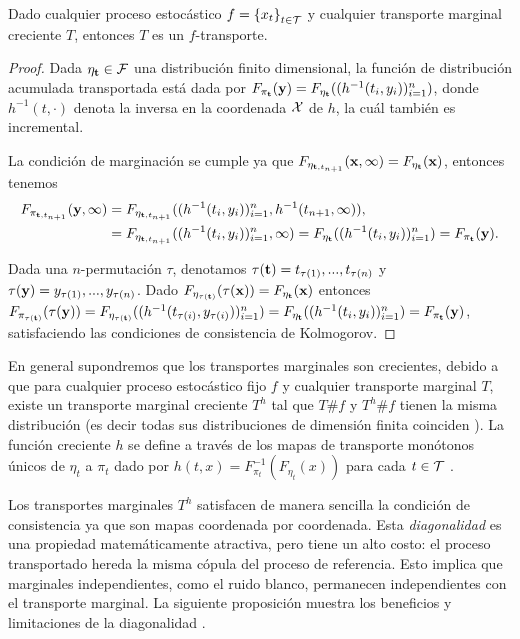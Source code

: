 \begin{proposition}
	Dado cualquier proceso estocástico \(f=\left\{ x_{t}\right\}_{t\in \mathcal{T}}\) y cualquier transporte marginal creciente \(T\), entonces \(T\) es un \(f\)-transporte.
	\begin{proof}
		Dada \(\eta_{\mathbf{t}} \in \mathcal{F}\) una distribución finito dimensional, la función de distribución acumulada transportada está dada por \(F_{\pi_{\mathbf{t}}}(\mathbf{y}) = F_{\eta_{\mathbf{t}}}((h^{-1}(t_i,y_i))_{i=1}^n)\), donde \(h^{-1}(t,\cdot)\) denota la inversa en la coordenada \(\mathcal{X}\) de \(h\), la cuál también es incremental. 
		
		La condición de marginación se cumple ya que \(F_{\eta_{\mathbf{t},t_{n+1}}}(\mathbf{x},\infty) = F_{\eta_{\mathbf{t}}}(\mathbf{x})\), entonces tenemos
		\begin{align*}
			F_{\pi_{\mathbf{t},t_{n+1}}}(\mathbf{y},\infty) &= F_{\eta_{\mathbf{t},t_{n+1}}}((h^{-1}(t_i,y_i))_{i=1}^n, h^{-1}(t_{n+1},\infty)),\\
			&=F_{\eta_{\mathbf{t},t_{n+1}}}((h^{-1}(t_i,y_i))_{i=1}^n, \infty)
			=F_{\eta_{\mathbf{t}}}((h^{-1}(t_i,y_i))_{i=1}^n)=F_{\pi_{\mathbf{t}}}(\mathbf{y}).
		\end{align*}
		
		Dada una \(n\)-permutación \(\tau\), denotamos \(\tau(\mathbf{t}) = t_{\tau(1)},...,t_{\tau(n)}\) y \(\tau(\mathbf{y}) = y_{\tau(1)},...,y_{\tau(n)}\). Dado \(F_{\eta_{\tau(\mathbf{t})}}(\tau(\mathbf{x})) = F_{\eta_{\mathbf{t}}}(\mathbf{x})\) entonces  \(F_{\pi_{\tau(\mathbf{t})}}(\tau(\mathbf{y})) =  F_{\eta_{\tau(\mathbf{t})}}((h^{-1}(t_{\tau(i)},y_{\tau(i)}))_{i=1}^n)=F_{\eta_{\mathbf{t}}}((h^{-1}(t_i,y_i))_{i=1}^n)=F_{\pi_{\mathbf{t}}}(\mathbf{y})\), satisfaciendo las condiciones de consistencia de Kolmogorov. 
	\end{proof}
\end{proposition}

\begin{remark}
	En general supondremos que los transportes marginales son crecientes, debido a que para cualquier proceso estocástico fijo \(f\) y cualquier transporte marginal \(T\), existe un transporte marginal creciente \(T^h\) tal que \(T\#f\) y \(T^h\#f\) tienen la misma distribución (es decir todas sus distribuciones de dimensión finita coinciden \cite{shalizi2010almost}). La función creciente \(h\) se define a través de los mapas de transporte monótonos únicos de \(\eta_t\) a \(\pi_t\) dado por \(h(t,x) = F_{\pi_t}^{-1}(F_{\eta_t}(x))\) para cada \(t \in \mathcal{T}\) \cite{cuestaalbertos1993optimal}.
\end{remark}


Los transportes marginales \(T^h\) satisfacen de manera sencilla la condición de consistencia ya que son mapas coordenada por coordenada. Esta \emph{diagonalidad} es una propiedad matemáticamente atractiva, pero tiene un alto costo: el proceso transportado hereda la misma cópula del proceso de referencia. Esto implica que marginales independientes, como el ruido blanco, permanecen independientes con el transporte marginal. La siguiente proposición muestra los beneficios y limitaciones de la diagonalidad \cite{wilson2010copula}.

